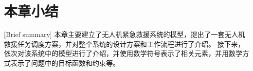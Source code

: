 \section{本章小结}[Brief summary] 
本章主要建立了无人机紧急救援系统的模型，提出了一套无人机救援任务调度方案，并对整个系统的设计方案和工作流程进行了介绍。
接下来，依次对该系统中的模型进行了介绍，并使用数学符号表示了相关元素，并用数学方式表示了问题中的目标函数和约束等。

